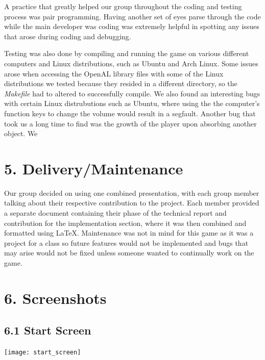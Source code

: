 \documentclass[12pt]{report}
\begin{document}
A practice that greatly helped our group throughout the coding and testing process was pair programming. Having another set of eyes parse through the code while the main developer was coding was extremely helpful in spotting any issues that arose during coding and debugging. \bigskip

Testing was also done by compiling and running the game on various different computers and Linux distributions, such as Ubuntu and Arch Linux. Some issues arose when accessing the OpenAL library files with some of the Linux distributions we tested because they resided in a different directory, so the \textit{Makefile} had to altered to successfully compile. We also found an interesting bugs with certain Linux distrubutions such as Ubuntu, where using the the computer's function keys to change the volume would result in a segfault. Another bug that took us a long time to find was the growth of the player upon absorbing another object. We 

\newpage
\section*{5. Delivery/Maintenance}
Our group decided on using one combined presentation, with each group member talking about their respective contribution to the project. Each member provided a separate document containing their phase of the technical report and contribution for the implementation section, where it was then combined and formatted using LaTeX. Maintenance was not in mind for this game as it was a project for a class so future features would not be implemented and bugs that may arise would not be fixed unless someone wanted to continually work on the game.

\newpage
\section*{6. Screenshots}

\subsection*{6.1 Start Screen}
\texttt{[image: start\_screen]}
\end{document}
